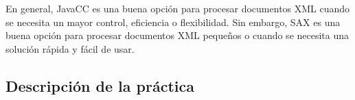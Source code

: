 En general, JavaCC es una buena opción para procesar documentos XML cuando se necesita un mayor control, eficiencia o flexibilidad. Sin embargo, SAX es una buena opción para procesar documentos XML pequeños o cuando se necesita una solución rápida y fácil de usar.

\subsection{Descripción de la práctica}





